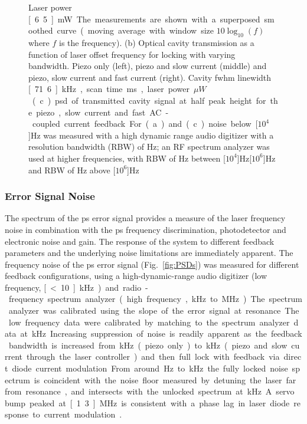 \begin{figure}[htbp]
{Laser power \unit[6.5]{mW}.
The measurements are shown with a superposed smoothed curve (moving average  with window size $10\log_{10}(f)$ where $f$ is the frequency).
(b) Optical cavity transmission as a function of laser offset frequency for locking with varying bandwidth.
Piezo only (left), piezo and slow current (middle) and piezo, slow current and fast current (right).
Cavity \gls*{fwhm} linewidth \unit[71.6]{kHz}, scan time \unit[100]{ms}, laser power \unit[170]{$\mu W$}.
(c) \Gls*{psd} of transmitted cavity signal at half peak height for the piezo, slow current and fast AC-coupled current feedback.
For (a) and (c) noise below \unit[$10^4$]{Hz} was measured with a high dynamic range audio digitizer with a resolution bandwidth (RBW) of \unit[12]{Hz}; an RF spectrum analyzer was used at higher frequencies, with RBW of \unit[30]{Hz} between \unit[$10^4$]{Hz}\textendash\unit[$10^6$]{Hz} and RBW of \unit[300]{Hz} above \unit[$10^6$]{Hz}} 
\end{figure}

\subsubsection{Error Signal Noise}
The spectrum of the \gls*{ps} error signal provides a measure of the laser frequency noise in combination with the \gls*{ps} frequency discrimination, photodetector and electronic noise and gain.
The response of the system to different feedback parameters and the underlying noise limitations are immediately apparent.
The frequency noise  of the \gls*{ps} error signal (Fig.~\ref{fig:PSDs}) was measured for different feedback configurations, using a high-dynamic-range audio digitizer (low frequency, \unit[\textless10]{kHz}) and radio-frequency spectrum analyzer (high frequency, \unit[10]{kHz} to \unit[30]{MHz}).
The spectrum analyzer was calibrated using the slope of the error signal at resonance.
The low frequency data were calibrated by matching to the spectrum analyzer data at \unit[10]{kHz}.  

Increasing suppression of noise is readily apparent as the feedback bandwidth is increased from \unit[1]{kHz} (piezo only) to \unit[50]{kHz} (piezo and slow current through the laser controller) and then full lock with feedback via direct diode current modulation.
From around \unit[450]{Hz} to \unit[350]{kHz} the fully locked noise spectrum is coincident with the noise floor measured by detuning the laser far from resonance, and intersects with the unlocked spectrum at \unit[700]{kHz}.
A servo bump peaked at \unit[1.3]{MHz} is consistent with a phase lag in laser diode response to current modulation \cite{wiemanhollberg}.

